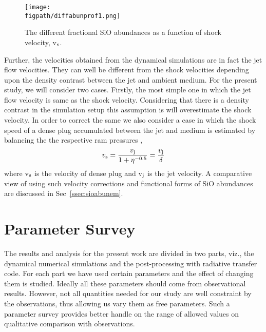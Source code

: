 \documentclass[useAMS,usenatbib,letters]{mn2e}
\newcommand{\figpath}{PFIGS/}
\begin{document}
\begin{figure}
 \texttt{[image: \\figpath/diffabunprof1.png]}
 \caption{The different fractional SiO abundances as a function of
   shock velocity, v$_{\rm s}$.}
 \label{abun}
\end{figure}

Further, the velocities obtained from the dynamical simulations are in fact the
jet flow velocities. They can well be different from the shock
velocities depending upon the density contrast between the jet and
ambient medium. For the present study, we will consider two
cases. Firstly, the most simple one in which the jet flow velocity is
same as the shock velocity. Considering that there is a density
contrast in the simulation setup this assumption is will
overestimate the shock velocity. In order to correct the same we also
consider a case in which the shock speed of a dense plug accumulated
between the jet and medium is estimated by balancing the the respective ram
pressures \citep{Masson:1993p9661},
\begin{equation}
\label{eq:shockjetvel}
v_{\rm s} = \frac{v_{\rm j}}{1 + \eta^{-0.5}} = \frac{v_{\rm j}}{\delta}
\end{equation}
where v$_{\rm s}$ is the velocity of dense plug and v$_{\rm j}$ is the
jet velocity. A comparative view of using such velocity corrections and
functional forms of SiO abundances are discussed in
Sec~\ref{ssec:sioabunem}.

    







\section{Parameter Survey}
The results and analysis for the present work are divided in two parts,
viz., the dynamical numerical simulations and the post-processing with
radiative transfer code. For each part we have used certain parameters
and the effect of changing them is studied. Ideally all these parameters should come from observational
results. However, not all quantities needed for our study are well
constraint by the observations, thus allowing us vary them as
free parameters. Such a parameter survey provides better handle on the range of allowed
values on qualitative comparison with observations. 
%
\end{document}
